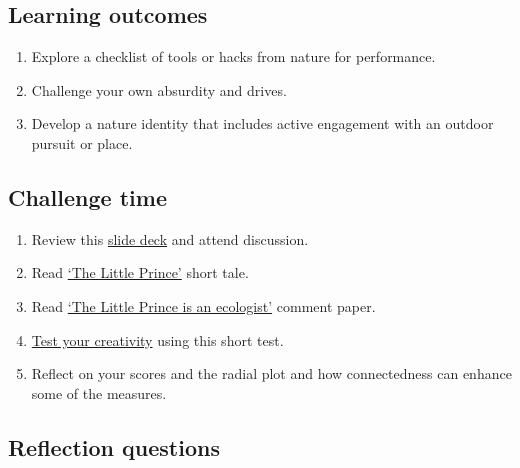 \documentclass[
]{book}
\providecommand{\tightlist}{%
  \setlength{\itemsep}{0pt}\setlength{\parskip}{0pt}}
\begin{document}
\hypertarget{learning-outcomes-1}{%
\subsection*{Learning outcomes}\label{learning-outcomes-1}}

\begin{enumerate}
\def\labelenumi{\arabic{enumi}.}
\tightlist
\item
  Explore a checklist of tools or hacks from nature for performance.\\
\item
  Challenge your own absurdity and drives.\\
\item
  Develop a nature identity that includes active engagement with an outdoor pursuit or place.
\end{enumerate}

\hypertarget{challenge-time-1}{%
\subsection*{Challenge time}\label{challenge-time-1}}

\begin{enumerate}
\def\labelenumi{\arabic{enumi}.}
\tightlist
\item
  Review this \href{https://figshare.com/articles/presentation/Nature_hacks_for_life/16878808}{slide deck} and attend discussion.\\
\item
  Read \href{https://www.goodreads.com/book/show/157993.The_Little_Prince}{`The Little Prince'} short tale.\\
\item
  Read \href{https://ojs.library.queensu.ca/index.php/IEE/article/view/15122}{`The Little Prince is an ecologist'} comment paper.\\
\item
  \href{http://www.testmycreativity.com}{Test your creativity} using this short test.\\
\item
  Reflect on your scores and the radial plot and how connectedness can enhance some of the measures.
\end{enumerate}

\hypertarget{reflection-questions-1}{%
\subsection*{Reflection questions}\label{reflection-questions-1}}
\end{document}
